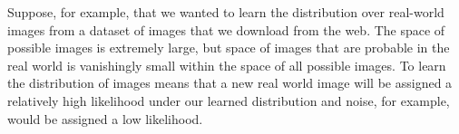 \documentclass{article}
\begin{document}
Suppose, for example, that we wanted to learn the distribution over real-world
images from a dataset of images that we download from the web. The space of
possible images is extremely large, but space of images that are probable in
the real world is vanishingly small within the space of all possible images. To
learn the distribution of images means that a new real world image will be
assigned a relatively high likelihood under our learned distribution and noise,
for example, would be assigned a low likelihood.
\end{document}
